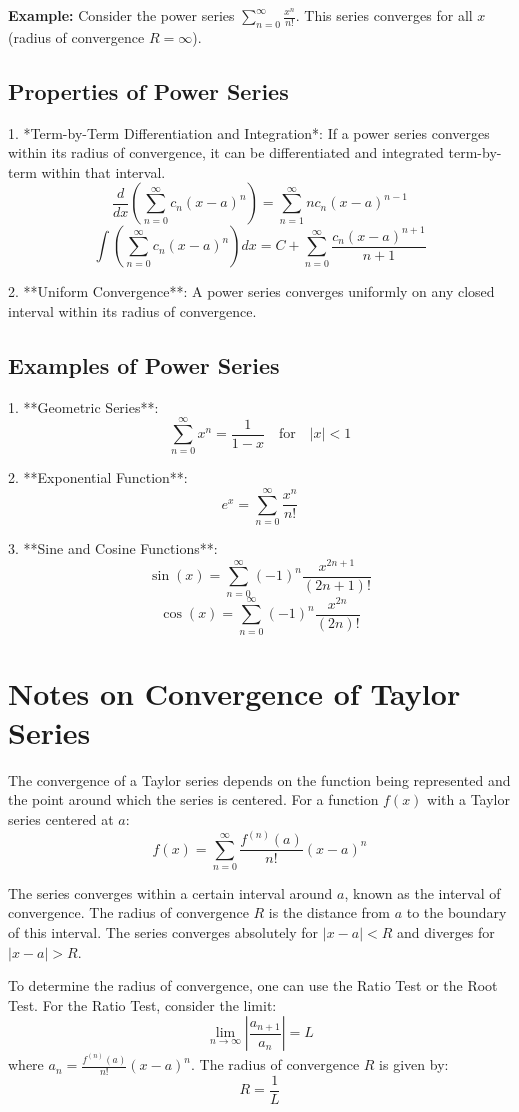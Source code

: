 \documentclass{article}
\begin{document}
\textbf{Example:}
Consider the power series \(\sum_{n=0}^{\infty} \frac{x^n}{n!}\). This series converges for all \(x\) (radius of convergence \(R = \infty\)).

\subsection*{Properties of Power Series}
1. *Term-by-Term Differentiation and Integration*: If a power series converges within its radius of convergence, it can be differentiated and integrated term-by-term within that interval.
   \[ \frac{d}{dx} \left( \sum_{n=0}^{\infty} c_n (x-a)^n \right) = \sum_{n=1}^{\infty} n c_n (x-a)^{n-1} \]
   \[ \int \left( \sum_{n=0}^{\infty} c_n (x-a)^n \right) dx = C + \sum_{n=0}^{\infty} \frac{c_n (x-a)^{n+1}}{n+1} \]

2. **Uniform Convergence**: A power series converges uniformly on any closed interval within its radius of convergence.

\subsection*{Examples of Power Series}
1. **Geometric Series**: 
   \[ \sum_{n=0}^{\infty} x^n = \frac{1}{1-x} \quad \text{for} \quad |x| < 1 \]

2. **Exponential Function**:
   \[ e^x = \sum_{n=0}^{\infty} \frac{x^n}{n!} \]

3. **Sine and Cosine Functions**:
   \[ \sin(x) = \sum_{n=0}^{\infty} (-1)^n \frac{x^{2n+1}}{(2n+1)!} \]
   \[ \cos(x) = \sum_{n=0}^{\infty} (-1)^n \frac{x^{2n}}{(2n)!} \]

\section*{Notes on Convergence of Taylor Series}
The convergence of a Taylor series depends on the function being represented and the point around which the series is centered. For a function \(f(x)\) with a Taylor series centered at \(a\):
\[ f(x) = \sum_{n=0}^{\infty} \frac{f^{(n)}(a)}{n!} (x-a)^n \]

The series converges within a certain interval around \(a\), known as the interval of convergence. The radius of convergence \(R\) is the distance from \(a\) to the boundary of this interval. The series converges absolutely for \(|x - a| < R\) and diverges for \(|x - a| > R\).

To determine the radius of convergence, one can use the Ratio Test or the Root Test. For the Ratio Test, consider the limit:
\[ \lim_{n \to \infty} \left| \frac{a_{n+1}}{a_n} \right| = L \]
where \(a_n = \frac{f^{(n)}(a)}{n!} (x-a)^n\). The radius of convergence \(R\) is given by:
\[ R = \frac{1}{L} \]
\end{document}
